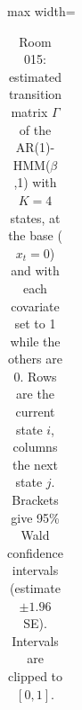 \begin{table}[ht]
\begin{adjustbox}{max width=\textwidth}
\begin{tabular}{lcccc|cccc|cccc}
\hline
\end{tabular}
\end{adjustbox}
\caption{Room 015: estimated transition matrix $\Gamma$ of the AR(1)-HMM($\beta$,1) with $K=4$ states, at the base ($x_t = 0$) and with each covariate set to 1 while the others are 0. Rows are the current state $i$, columns the next state $j$. Brackets give 95\% Wald confidence intervals (estimate $\pm 1.96$ SE). Intervals are clipped to $[0, 1]$.}
\label{tab:params_transition_room_015_calibrated_anchor_random_search_ar1_hmm_beta_1_K4}
\end{table}
